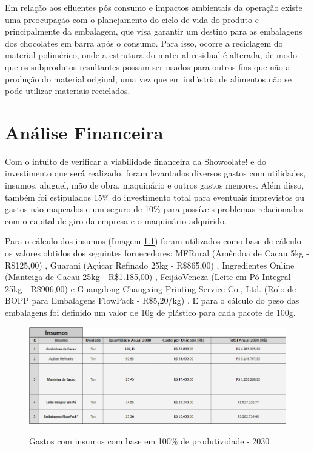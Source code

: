 \documentclass[
	12pt,				%
	openright,			%
	oneside,			%
	a4paper,			%
	english,			%
	french,				%
	spanish,			%
	brazil				%
	]{abntex2}
\begin{document}
Em relação aos efluentes pós consumo e impactos ambientais da operação existe uma preocupação com o planejamento do ciclo de vida do produto e principalmente da embalagem, que visa garantir um destino para as embalagens dos chocolates em barra após o consumo. Para isso, ocorre a reciclagem do material polimérico, onde a estrutura do material residual é alterada, de modo que os subprodutos resultantes possam ser usados para outros fins que não a produção do material original, uma vez que em indústria de alimentos não se pode utilizar materiais reciclados.


\newpage
\chapter{Análise Financeira}

Com o intuito de verificar a viabilidade financeira da Showcolate! e do investimento que será realizado, foram levantados diversos gastos com utilidades, insumos, aluguel, mão de obra, maquinário e outros gastos menores. Além disso, também foi estipulados 15$\%$ do investimento total para eventuais imprevistos ou gastos não mapeados e um seguro de 10$\%$ para possíveis problemas relacionados com o capital de giro da empresa e o maquinário adquirido.

Para o cálculo dos insumos (Imagem \ref{1}) foram utilizados como base de cálculo os valores obtidos dos seguintes fornecedores: MFRural (Amêndoa de Cacau 5kg - R\$125,00) \cite{i1}, Guarani (Açúcar Refinado 25kg - R\$865,00) \cite{i2}, Ingredientes Online (Manteiga de Cacau 25kg - R\$1.185,00) \cite{i3}, FeijãoVeneza (Leite em Pó Integral 25kg - R\$906,00) \cite{i4} e Guangdong Changxing Printing Service Co., Ltd. (Rolo de BOPP para Embalagens FlowPack - R\$5,20/kg) \cite{i5}. E para o cálculo do peso das embalagens foi definido um valor de 10g de plástico para cada pacote de 100g. 

\begin{figure}[H]
\begin{center}
\caption{Gastos com insumos com base em 100$\%$ de produtividade - 2030}
\includegraphics[scale=0.5]{1.jpeg} 
\label{1}
\end{center}
\end{figure}
\end{document}
